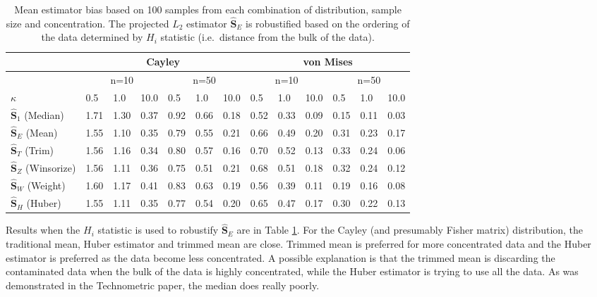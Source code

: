 \documentclass{article}\usepackage[]{graphicx}\usepackage[]{color}
\newcommand{\ProjMean}{{\widehat{\bm S}_{E}}}
\newcommand{\ProjMedian}{{\widehat{\bm S}_{1}}}
\newcommand{\HuberMean}{{\widehat{\bm S}_H}}
\newcommand{\WeightMean}{{\widehat{\bm S}_W}}
\newcommand{\TrimMean}{{\widehat{\bm S}_T}}
\newcommand{\WinzMean}{{\widehat{\bm S}_Z}}
\newcommand{\red}[1]{{\color{red} #1}}
\begin{document}
\begin{table}[ht]
\centering
\begin{tabular}{l|lll|lll|lll|lll}
  \hline
 & \multicolumn{6}{|c|}{Cayley} & \multicolumn{6}{|c}{von Mises}   \\ 
\hline
   &  \multicolumn{3}{|c|}{n=10} & \multicolumn{3}{|c|}{n=50} & \multicolumn{3}{|c|}{n=10} & \multicolumn{3}{|c}{n=50} \\ 
  $\kappa$ &  0.5 &  1.0 & 10.0 &  0.5 &  1.0 & 10.0 &  0.5 &  1.0 & 10.0 &  0.5 &  1.0 & 10.0 \\ \hline
  $\ProjMedian$ (Median) & 1.71 & 1.30 & 0.37 & 0.92 & 0.66 & 0.18 & \red{ 0.52 }& \red{ 0.33} & \red{ 0.09} & \red{ 0.15} & \red{ 0.11} & \red{ 0.03} \\ 
  $\ProjMean$ (Mean) & \red{ 1.55} & \red{ 1.10} & 0.35 & 0.79 & 0.55 & 0.21 & 0.66 & 0.49 & 0.20 & 0.31 & 0.23 & 0.17 \\ 
  $\TrimMean$ (Trim) & 1.56 & 1.16 & \red{ 0.34} & 0.80 & 0.57 & \red{ 0.16} & 0.70 & 0.52 & 0.13 & 0.33 & 0.24 & 0.06 \\ 
  $\WinzMean$ (Winsorize)& 1.56 & 1.11 & 0.36 & \red{ 0.75} & \red{ 0.51} & 0.21 & 0.68 & 0.51 & 0.18 & 0.32& 0.24 & 0.12 \\ 
  $\WeightMean$ (Weight) & 1.60 & 1.17 & 0.41 & 0.83 & 0.63 & 0.19 & 0.56 & 0.39 & 0.11 & 0.19 & 0.16 & 0.08 \\ 
  $\HuberMean$ (Huber) & \red{ 1.55} & 1.11 & 0.35 & 0.77 & 0.54 & 0.20 & 0.65 & 0.47 & 0.17 & 0.30 & 0.22 & 0.13 \\ 
   \hline
\end{tabular}
\caption{Mean estimator bias based on 100 samples from each combination of distribution, sample size and concentration.  The projected $L_2$ estimator $\ProjMean$ is robustified based on the ordering of the data determined by $H_i$ statistic (i.e.~distance from the bulk of the data).}
\label{tab:SimResHn}
\end{table}

Results when the $H_i$ statistic is used to robustify $\ProjMean$ are in Table \ref{tab:SimResHn}.  For the Cayley (and presumably Fisher matrix) distribution, the traditional mean, Huber estimator and trimmed mean are close.  Trimmed mean is preferred for more concentrated data and the Huber estimator is preferred as the data become less concentrated.  A possible explanation is that the trimmed mean is discarding the contaminated data when the bulk of the data is highly concentrated, while the Huber estimator is trying to use all the data.  As was demonstrated in the Technometric paper, the median does really poorly.
\end{document}
